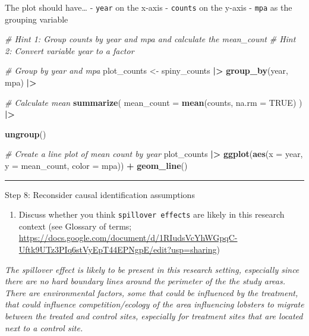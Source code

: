 \documentclass[
]{article}
\newenvironment{Shaded}{\begin{snugshade}}{\end{snugshade}}
\newcommand{\AttributeTok}[1]{\textcolor[rgb]{0.13,0.29,0.53}{#1}}
\newcommand{\CommentTok}[1]{\textcolor[rgb]{0.56,0.35,0.01}{\textit{#1}}}
\newcommand{\ConstantTok}[1]{\textcolor[rgb]{0.56,0.35,0.01}{#1}}
\newcommand{\FunctionTok}[1]{\textcolor[rgb]{0.13,0.29,0.53}{\textbf{#1}}}
\newcommand{\NormalTok}[1]{#1}
\newcommand{\OtherTok}[1]{\textcolor[rgb]{0.56,0.35,0.01}{#1}}
\newcommand{\SpecialCharTok}[1]{\textcolor[rgb]{0.81,0.36,0.00}{\textbf{#1}}}
\providecommand{\tightlist}{%
  \setlength{\itemsep}{0pt}\setlength{\parskip}{0pt}}
\begin{document}
The plot should have\ldots{} - \texttt{year} on the x-axis -
\texttt{counts} on the y-axis - \texttt{mpa} as the grouping variable

\begin{Shaded}
\begin{Highlighting}[]
\CommentTok{\# Hint 1: Group counts by \textasciigrave{}year\textasciigrave{} and \textasciigrave{}mpa\textasciigrave{} and calculate the \textasciigrave{}mean\_count\textasciigrave{}}
\CommentTok{\# Hint 2: Convert variable \textasciigrave{}year\textasciigrave{} to a factor}

\CommentTok{\# Group by year and mpa}
\NormalTok{plot\_counts }\OtherTok{\textless{}{-}}\NormalTok{ spiny\_counts }\SpecialCharTok{|\textgreater{}} 
    \FunctionTok{group\_by}\NormalTok{(year, mpa) }\SpecialCharTok{|\textgreater{}}
    
    \CommentTok{\# Calculate mean}
    \FunctionTok{summarize}\NormalTok{(}
        \AttributeTok{mean\_count =} \FunctionTok{mean}\NormalTok{(counts, }\AttributeTok{na.rm =} \ConstantTok{TRUE}\NormalTok{)}
\NormalTok{    ) }\SpecialCharTok{|\textgreater{}}
    
    \FunctionTok{ungroup}\NormalTok{()}

\CommentTok{\# Create a line plot of mean count by year}
\NormalTok{plot\_counts }\SpecialCharTok{|\textgreater{}} \FunctionTok{ggplot}\NormalTok{(}\FunctionTok{aes}\NormalTok{(}\AttributeTok{x =}\NormalTok{ year, }\AttributeTok{y =}\NormalTok{ mean\_count, }\AttributeTok{color =}\NormalTok{ mpa)) }\SpecialCharTok{+}
    \FunctionTok{geom\_line}\NormalTok{()}
\end{Highlighting}
\end{Shaded}

\begin{center}\rule{0.5\linewidth}{0.5pt}\end{center}

Step 8: Reconsider causal identification assumptions

\begin{enumerate}
\def\labelenumi{\alph{enumi}.}
\tightlist
\item
  Discuss whether you think \texttt{spillover\ effects} are likely in
  this research context (see Glossary of terms;
  \url{https://docs.google.com/document/d/1RIudsVcYhWGpqC-Uftk9UTz3PIq6stVyEpT44EPNgpE/edit?usp=sharing})
\end{enumerate}

\emph{The spillover effect is likely to be present in this research
setting, especially since there are no hard boundary lines around the
perimeter of the the study areas. There are environmental factors, some
that could be influenced by the treatment, that could influence
competition/ecology of the area influencing lobsters to migrate between
the treated and control sites, especially for treatment sites that are
located next to a control site.}
\end{document}
